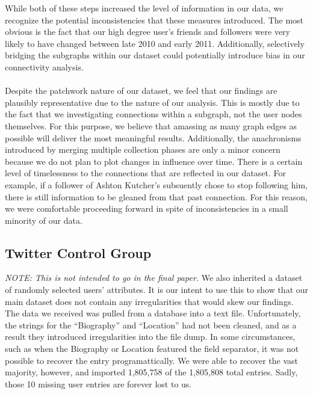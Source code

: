 While both of these steps increased the level of information in our data, we recognize the potential inconsistencies that these measures introduced.  The most obvious is the fact that our high degree user's friends and followers were very likely to have changed between late 2010 and early 2011.  Additionally, selectively bridging the subgraphs within our dataset could potentially introduce bias in our connectivity analysis.\\\\
Despite the patchwork nature of our dataset, we feel that our findings are plausibly representative due to the nature of our analysis.  This is mostly due to the fact that we investigating connections within a subgraph, not the user nodes themselves.  For this purpose, we believe that amassing as many graph edges as possible will deliver the most meaningful results.  Additionally, the anachronisms introduced by merging multiple collection phases are only a minor concern because we do not plan to plot changes in influence over time.  There is a certain level of timelessness to the connections that are reflected in our dataset.  For example, if a follower of Ashton Kutcher's subsuently chose to stop following him, there is still information to be gleaned from that past connection.  For this reason, we were comfortable proceeding forward in spite of inconsistencies in a small minority of our data.

\subsection{Twitter Control Group}
\textit{NOTE: This is not intended to go in the final paper.}  We also inherited a dataset of randomly selected users' attributes.  It is our intent to use this to show that our main dataset does not contain any irregularities that would skew our findings.  The data we received was pulled from a database into a text file.  Unfortunately, the strings for the ``Biography'' and ``Location'' had not been cleaned, and as a result they introduced irregularities into the file dump.  In some circumstances, such as when the Biography or Location featured the field separator, it was not possible to recover the entry programattically.  We were able to recover the vast majority, however, and imported 1,805,758 of the 1,805,808 total entries.  Sadly, those 10 missing user entries are forever lost to us.

